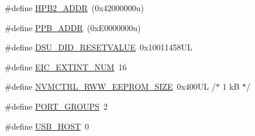 \begin{DoxyCompactItemize}
\item 
\#define \mbox{\hyperlink{group___s_a_m_d21_g15_l__definitions_gaef42fa53ddf169a2a50be70d29f73571}{H\+P\+B2\+\_\+\+A\+D\+DR}}~(0x42000000u)
\item 
\#define \mbox{\hyperlink{group___s_a_m_d21_g15_l__definitions_ga8895d0a3a9a3126cc44330f86c8ce564}{P\+P\+B\+\_\+\+A\+D\+DR}}~(0x\+E0000000u)
\item 
\#define \mbox{\hyperlink{group___s_a_m_d21_g15_l__definitions_gada75131d542c9e1966238f5488f89bd6}{D\+S\+U\+\_\+\+D\+I\+D\+\_\+\+R\+E\+S\+E\+T\+V\+A\+L\+UE}}~0x10011458\+UL
\item 
\#define \mbox{\hyperlink{group___s_a_m_d21_g15_l__definitions_ga88ebc38c95506296f5d21f82476296ae}{E\+I\+C\+\_\+\+E\+X\+T\+I\+N\+T\+\_\+\+N\+UM}}~16
\item 
\#define \mbox{\hyperlink{group___s_a_m_d21_g15_l__definitions_gacb7a115808eeb0b50bd55888f9ba65ae}{N\+V\+M\+C\+T\+R\+L\+\_\+\+R\+W\+W\+\_\+\+E\+E\+P\+R\+O\+M\+\_\+\+S\+I\+ZE}}~0x400\+U\+L /$\ast$ 1 k\+B $\ast$/
\item 
\#define \mbox{\hyperlink{group___s_a_m_d21_g15_l__definitions_gab9243ffe03a1dc631b57a495b4b3d467}{P\+O\+R\+T\+\_\+\+G\+R\+O\+U\+PS}}~2
\item 
\#define \mbox{\hyperlink{group___s_a_m_d21_g15_l__definitions_ga856aa08fb33114928cbc8635be1792e4}{U\+S\+B\+\_\+\+H\+O\+ST}}~0
\end{DoxyCompactItemize}
